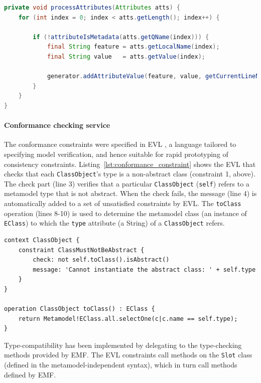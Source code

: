 \begin{lstlisting}[caption=Parsing XMI attributes (in Java), label=lst:xmi_parser, language=Java]
private void processAttributes(Attributes atts) {
	for (int index = 0; index < atts.getLength(); index++) {
		
		if (!attributeIsMetadata(atts.getQName(index))) {
			final String feature = atts.getLocalName(index);
			final String value   = atts.getValue(index);
			
			generator.addAttributeValue(feature, value, getCurrentLineNumber());
		}
	}
}
\end{lstlisting}

\paragraph{Conformance checking service} The conformance constraints were specified in EVL \cite{kolovos08evl}, a language tailored to specifying model verification, and hence suitable for rapid prototyping of consistency constraints. Listing~\ref{lst:conformance_constraint} shows the EVL that checks that each \texttt{ClassObject}'s type is a non-abstract class (constraint 1, above). The check part (line 3) verifies that a particular \texttt{ClassObject} (\texttt{self}) refers to a metamodel type that is not abstract. When the check fails, the message (line 4) is automatically added to a set of unsatisfied constraints by EVL. The \texttt{toClass} operation (lines 8-10) is used to determine the metamodel class (an instance of \texttt{EClass}) to which the \texttt{type} attribute (a String) of a \texttt{ClassObject} refers.

\begin{lstlisting}[caption=A constraint (in EVL) to check that only concrete metamodel types are instantiated., label=lst:conformance_constraint, language=EVL]
context ClassObject {
	constraint ClassMustNotBeAbstract {
		check: not self.toClass().isAbstract()
		message: 'Cannot instantiate the abstract class: ' + self.type
	}
}

operation ClassObject toClass() : EClass {
	return Metamodel!EClass.all.selectOne(c|c.name == self.type);
}
\end{lstlisting}

Type-compatibility has been implemented by delegating to the type-checking methods provided by EMF. The EVL constraints call methods on the \texttt{Slot} class (defined in the metamodel-independent syntax), which in turn call methods defined by EMF.

